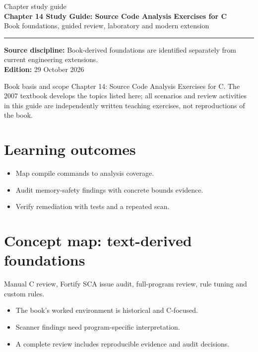 \documentclass[10pt,letterpaper]{article}
\begin{document}
\hypersetup{pageanchor=false}%
\begin{titlepage}
\vspace*{1.0in}
{\color{bluegray}\Large Chapter study guide}\\[1.0em]
{\color{navy}\Huge\bfseries Chapter 14 Study Guide: Source Code Analysis Exercises for C}\\[0.7em]
{\Large Book foundations, guided review, laboratory and modern extension}\\[2.0em]
\rule{\linewidth}{1.0pt}
\vfill
\textbf{Source discipline:} Book-derived foundations are identified separately from current engineering extensions.\\
\textbf{Edition:} 29 October 2026
\end{titlepage}\hypersetup{pageanchor=true}
\tableofcontents
\clearpage
\begin{focusbox}{Book basis and scope}
Chapter 14: Source Code Analysis Exercises for C. The 2007 textbook develops the topics listed here; all scenarios and review activities in this guide are independently written teaching exercises, not reproductions of the book.\end{focusbox}
\section{Learning outcomes}
\begin{itemize}
\item Map compile commands to analysis coverage.
\item Audit memory-safety findings with concrete bounds evidence.
\item Verify remediation with tests and a repeated scan.
\end{itemize}

\section{Concept map: text-derived foundations}
Manual C review, Fortify SCA issue audit, full-program review, rule tuning and custom rules.
\begin{itemize}
\item The book's worked environment is historical and C-focused.
\item Scanner findings need program-specific interpretation.
\item A complete review includes reproducible evidence and audit decisions.
\end{itemize}
\end{document}

